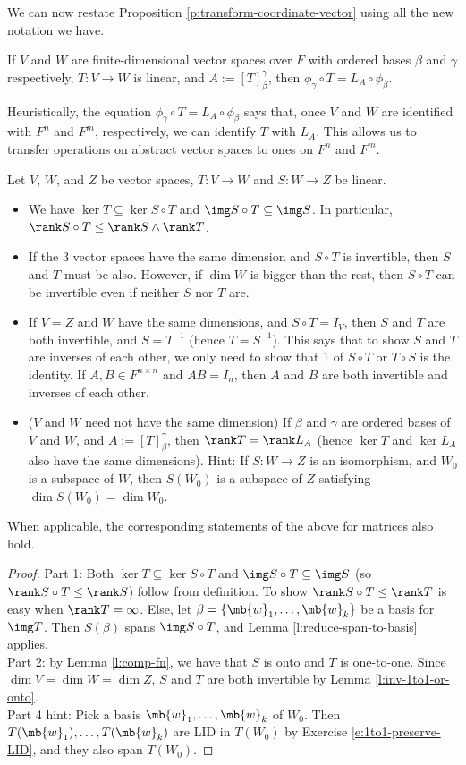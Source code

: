 We can now restate Proposition \ref{p:transform-coordinate-vector} using all the new notation we have.
\begin{prop}
If $V$ and $W$ are finite-dimensional vector spaces over $F$ with ordered bases $\beta$ and $\gamma$ respectively, $T:V \to W$ is linear, and $A:=[T]_\beta^\gamma$, then $\phi_\gamma \circ T=L_A \circ \phi_\beta$.
\end{prop}
Heuristically, the equation $\phi_\gamma \circ T=L_A \circ \phi_\beta$ says that, once $V$ and $W$ are identified with $F^n$ and $F^m$, respectively, we can identify $T$ with $L_A$. This allows us to transfer operations on abstract vector spaces to ones on $F^n$ and $F^m$.
\begin{exer}\label{e:comp1to1}
Let $V$, $W$, and $Z$ be vector spaces, $T:V \to W$ and $S:W \to Z$ be linear.
\begin{itemize}
\item We have $\ker T \subseteq \ker S \circ T$ and $\img S \circ T \subseteq \img S$. In particular, $\rank S \circ T \leq \rank S \wedge \rank T$.
\item If the 3 vector spaces have the same dimension and $S \circ T$ is invertible, then $S$ and $T$ must be also. However, if $\dim W$ is bigger than the rest, then $S \circ T$ can be invertible even if neither $S$ nor $T$ are.
\item If $V=Z$ and $W$ have the same dimensions, and $S \circ T=I_V$, then $S$ and $T$ are both invertible, and $S=T^{-1}$ (hence $T=S^{-1}$). This says that to show $S$ and $T$ are inverses of each other, we only need to show that 1 of $S \circ T$ or $T \circ S$ is the identity. If $A,B \in F^{n \times n}$ and $AB=I_n$, then $A$ and $B$ are both invertible and inverses of each other.
\item ($V$ and $W$ need not have the same dimension) If $\beta$ and $\gamma$ are ordered bases of $V$ and $W$, and $A:=[T]_\beta^\gamma$, then $\rank T= \rank L_A$ (hence $\ker T$ and $\ker L_A$ also have the same dimensions).
Hint: If $S:W \to Z$ is an isomorphism, and $W_0$ is a subspace of $W$, then $S(W_0)$ is a subspace of $Z$ satisfying $\dim S(W_0)= \dim W_0$.
\end{itemize}
When applicable, the corresponding statements of the above for matrices also hold.
\end{exer}
\begin{proof}
Part 1: Both $\ker T \subseteq \ker S \circ T$ and $\img S \circ T \subseteq \img S$ (so $\rank S \circ T \leq \rank S$) follow from definition.
To show $\rank S \circ T \leq \rank T$ is easy when $\rank T= \infty$. Else, let $\beta= \{ \mb{w}_1, \ldots, \mb{w}_k \}$ be a basis for $\img T$. Then $S( \beta)$ spans $\img S \circ T$, and Lemma \ref{l:reduce-span-to-basis} applies.\\
Part 2: by Lemma \ref{l:comp-fn}, we have that $S$ is onto and $T$ is one-to-one. Since $\dim V= \dim W= \dim Z$, $S$ and $T$ are both invertible by Lemma \ref{l:inv-1to1-or-onto}.\\
Part 4 hint: Pick a basis $\mb{w}_1, \ldots,\mb{w}_k$ of $W_0$. Then $T(\mb{w}_1), \ldots,T(\mb{w}_k)$ are LID in $T(W_0)$ by Exercise \ref{e:1to1-preserve-LID}, and they also span $T(W_0)$.
\end{proof}
